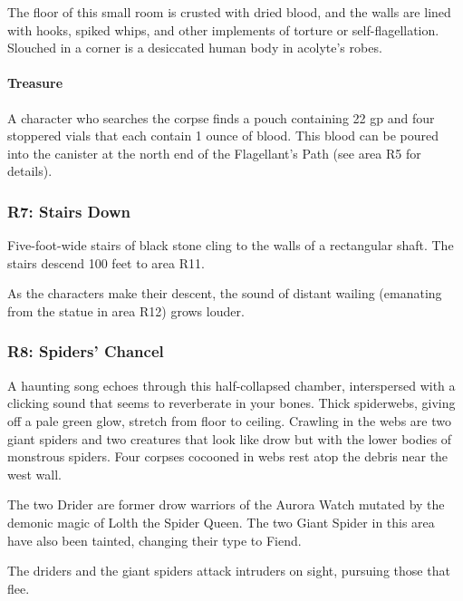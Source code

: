 \documentclass[10pt,a4paper,twoside,bg=print,twocolumn,openany,nodeprecatedcode]{dndbook}
\begin{document}
\begin{DndReadAloud}{}
The floor of this small room is crusted with dried blood, and the walls are lined with hooks, spiked whips, and other implements of torture or self-flagellation. Slouched in a corner is a desiccated human body in acolyte's robes.

\end{DndReadAloud}

\paragraph{Treasure}
A character who searches the corpse finds a pouch containing 22 gp and four stoppered vials that each contain 1 ounce of blood. This blood can be poured into the canister at the north end of the Flagellant's Path (see area R5 for details).

\subsubsection{R7: Stairs Down}
Five-foot-wide stairs of black stone cling to the walls of a rectangular shaft. The stairs descend 100 feet to area R11.

As the characters make their descent, the sound of distant wailing (emanating from the statue in area R12) grows louder.

\subsubsection{R8: Spiders' Chancel}
\begin{DndReadAloud}{}
A haunting song echoes through this half-collapsed chamber, interspersed with a clicking sound that seems to reverberate in your bones. Thick spiderwebs, giving off a pale green glow, stretch from floor to ceiling. Crawling in the webs are two giant spiders and two creatures that look like drow but with the lower bodies of monstrous spiders. Four corpses cocooned in webs rest atop the debris near the west wall.

\end{DndReadAloud}

The two Drider are former drow warriors of the Aurora Watch mutated by the demonic magic of Lolth the Spider Queen. The two Giant Spider in this area have also been tainted, changing their type to Fiend.

The driders and the giant spiders attack intruders on sight, pursuing those that flee.
\end{document}
